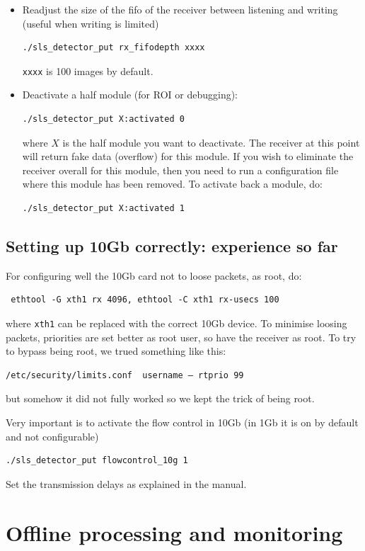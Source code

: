 \documentclass{article}
\begin{document}
\begin{itemize}
\item Readjust the size of the fifo of the receiver between listening and writing (useful when writing is limited)
\begin{verbatim}
./sls_detector_put rx_fifodepth xxxx
\end{verbatim}
 {\tt{xxxx}} is 100 images by default.
\item Deactivate a half module (for ROI or debugging):
\begin{verbatim}
./sls_detector_put X:activated 0 
\end{verbatim}
where $X$ is the half module you want to deactivate.
The receiver at this point will return fake data (overflow) for this module. If you wish to eliminate the receiver overall for this module, then you need to run a configuration file where this module has been removed.
To activate back a module, do:
\begin{verbatim}
./sls_detector_put X:activated 1
\end{verbatim}

\end{itemize}
\subsection{Setting up 10Gb correctly: experience so far}

For configuring well the 10Gb card not to loose packets, as root, do:
\begin{verbatim}
 ethtool -G xth1 rx 4096, ethtool -C xth1 rx-usecs 100 
\end{verbatim}
where {\tt{xth1}} can be replaced with the correct 10Gb device. To minimise loosing packets, priorities are set better as root user, so have the receiver as root.
To try to bypass being root, we trued something like this:
\begin{verbatim}
/etc/security/limits.conf  username – rtprio 99
\end{verbatim}
but somehow it did  not fully worked  so we kept the trick of being root.

Very important is to activate the flow control in 10Gb (in 1Gb it is on by default and not configurable)
\begin{verbatim}
./sls_detector_put flowcontrol_10g 1
\end{verbatim}
Set the transmission delays as explained in the manual.

\section{Offline processing and monitoring}
\end{document}
